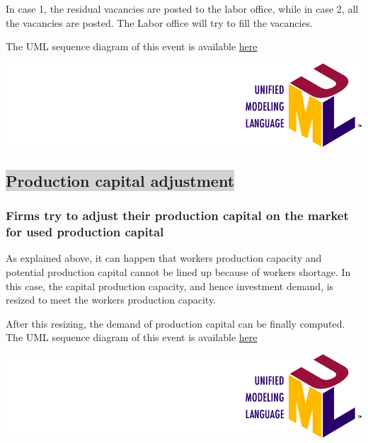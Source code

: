 \documentclass{book}
\newcommand{\doclocation}{file:///Users/giulioni/Documents/workspace/gabriele/docs}
\begin{document}
In case 1, the residual vacancies are posted to the labor office, while in case 2, all the vacancies are posted. The Labor office will try to fill the vacancies. 

\vskip3mm
The UML sequence diagram of this event is available \href{\doclocation/umldoc/laborForceUpwardAdjustment.html}{here}
\begin{marginfigure}
	\includegraphics[scale=0.1]{uml.png}
\end{marginfigure}


\subsection*{\colorbox{lightgray}{Production capital adjustment}}


\subsubsection{Firms try to adjust their production capital on the market for used production capital}

As explained above, it can happen that workers production capacity and potential production capital cannot be lined up because of workers shortage. In this case, the capital production capacity, and hence investment demand, is resized to meet the workers production capacity.

After this resizing, the demand of production capital can be finally computed.
\vskip3mm
The UML sequence diagram of this event is available \href{\doclocation/umldoc/adjustProductionCapitalAndBankAccount.html}{here}
\begin{marginfigure}
	\includegraphics[scale=0.1]{uml.png}
\end{marginfigure}
\end{document}
